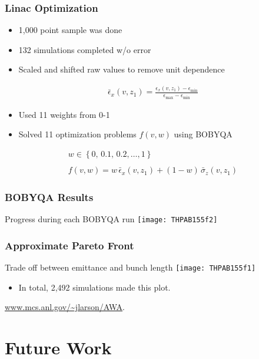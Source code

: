 \documentclass{beamer}
\begin{document}
\begin{frame}
	\frametitle{Linac Optimization}
	 \begin{itemize}
		  	\item{1,000 point sample was done}
		  	\item{132 simulations completed w/o error}
		  	\item{Scaled and shifted raw values to remove unit dependence}
	 \end{itemize}
	 \begin{align*}
	 \bar{\epsilon}_x (v,z_1) = \frac{ \epsilon_x (v,z_1) - \epsilon_{\min} } { \epsilon_{\max} - \epsilon_{\min} }
	 \end{align*}
	 
	 \begin{itemize}
	  	\item{Used 11 weights from 0-1}
	  	\item{Solved 11 optimization problems $f(v,w)$ using BOBYQA}
	 \end{itemize}
	 \begin{gather*}
	 w\in\left\{ 0, \,0.1, \,0.2, \ldots, 1 \right\}\\ \\
	 f(v,w) = w \,\bar{\epsilon}_x(v,z_1) + (1-w)\, \bar{\sigma}_z(v,z_1)
	 \end{gather*}
	

\end{frame}

\begin{frame}
	\frametitle{BOBYQA Results}
	Progress during each BOBYQA run
	\texttt{[image: THPAB155f2]}
\end{frame}

\begin{frame}
	\frametitle{Approximate Pareto Front}
	\centering
	Trade off between emittance and bunch length
	\texttt{[image: THPAB155f1]}
	\begin{itemize}
		\item In total, 2,492 simulations made this plot.
	\end{itemize}
\end{frame}

\begin{frame}
	\begin{center}
		\url{www.mcs.anl.gov/~jlarson/AWA}.
	\end{center}
\end{frame}
\section{Future Work}
\end{document}
